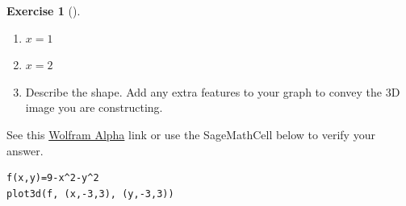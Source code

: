 \documentclass[10pt,]{book}
\theoremstyle{plain}
\theoremstyle{definition}
\theoremstyle{definition}
\theoremstyle{definition}
\theoremstyle{definition}
\newtheorem{exploration}[project]{Exercise}
\theoremstyle{definition}
\numberwithin{equation}{section}
\begin{document}
\begin{exploration}[]
\begin{enumerate}[font=\bfseries,label=(\alph*),ref=\alph*]
\begin{enumerate}[font=\bfseries,label=(\roman*),ref=\theenumi.\roman*]
\item\label{task-207} \(x=1\)%
\item\label{task-208} \(x=2\)%
\item\label{task-209} Describe the shape. Add any extra features to your graph to convey the 3D image you are constructing.%
\end{enumerate}
\end{enumerate}
\bigbreak
See this \href{http://wolfr.am/wny0IF}{Wolfram Alpha} link or use the SageMathCell below to verify your answer.%
\begin{lstlisting}[style=sageinput]
f(x,y)=9-x^2-y^2
plot3d(f, (x,-3,3), (y,-3,3))
\end{lstlisting}
\end{exploration}
\typeout{************************************************}
\typeout{************************************************}
\end{document}
